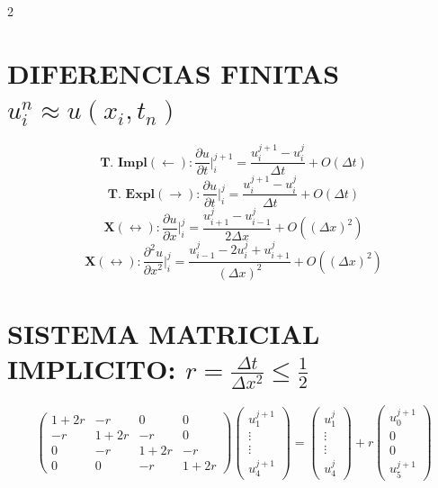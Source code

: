 \documentclass[10pt]{extarticle}
\newenvironment{term}
  {\begin{minipage}{\linewidth}}
  {\end{minipage}\par}
\begin{document}
\begin{multicols}{2}
\begin{term}
    \section*{DIFERENCIAS FINITAS $u^n_i\approx u(x_i,t_n)$}
    $$\textbf{T. Impl} (\leftarrow):\frac{\partial u}{\partial t}\bigg|^{j+1}_i = \frac{u_i^{j+1} - u_i^j}{\Delta t} + O(\Delta t)$$
    $$\textbf{T. Expl} (\rightarrow): \frac{\partial u}{\partial t}\bigg|^j_i = \frac{u_i^{j+1} - u_i^j}{\Delta t} + O(\Delta t)$$
    $$\textbf{X} (\leftrightarrow): \frac{\partial u}{\partial x}\bigg|^j_i = \frac{u_{i+1}^j - u_{i-1}^j}{2\Delta x} + O((\Delta x)^2)$$
    $$\textbf{X} (\leftrightarrow):\frac{\partial^2 u}{\partial x^2}\bigg|^j_i = \frac{u_{i-1}^j - 2u_i^j + u_{i+1}^j}{(\Delta x)^2} + O((\Delta x)^2)$$
\end{term}

\end{multicols}

\begin{term}
    \section*{SISTEMA MATRICIAL IMPLICITO: $r=\frac{\Delta t}{\Delta x^2}\leq\frac{1}{2}$}
    $$\begin{pmatrix}
        1+2r & -r & 0 & 0 \\
        -r & 1+2r & -r & 0 \\
        0 & -r & 1+2r & -r \\
        0 & 0 & -r & 1+2r
    \end{pmatrix}
    \begin{pmatrix} u_1^{j+1} \\ \vdots \\ \vdots \\ u_4^{j+1}\end{pmatrix}
    =\begin{pmatrix} u^j_1\\\vdots\\\vdots\\u_4^j \end{pmatrix}+r\begin{pmatrix}
        u^{j+1}_0\\0\\0\\u_{5}^{j+1}
    \end{pmatrix}$$
\end{term}
\end{document}
